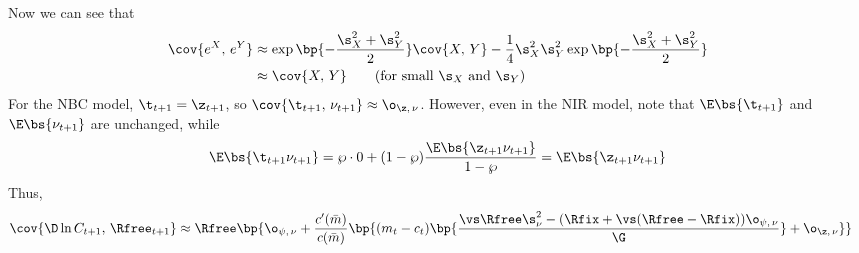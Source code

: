 Now we can see that
\begin{align*}
    \cov{e^X,\,e^Y} &\approx \exp\bp{-\frac{\s_X^2 + \s_Y^2}{2}}\cov{X,\,Y} - \frac{1}{4}{\s_X^2\s_Y^2}\exp\bp{-\frac{\s_X^2 + \s_Y^2}{2}}\\
    &\approx \cov{X,\,Y} \tag{for small $\s_X$ and $\s_Y$}
\end{align*}
For the NBC model, $\t_{t+1} = \z_{t+1}$, so $\cov{\t_{t+1},\,\nu_{t+1}} \approx \o_{\z,\,\nu}$. However, even in the NIR model, note that $\E\bs{\t_{t+1}}$ and $\E\bs{\nu_{t+1}}$ are unchanged, while
\[
\E\bs{\t_{t+1}\nu_{t+1}} = \wp\cdot 0 + (1-\wp)\frac{\E\bs{\z_{t+1}\nu_{t+1}}}{1-\wp} = \E\bs{\z_{t+1}\nu_{t+1}}
\]
Thus,
\begin{align*}
    \cov{\D\ln C_{t+1},\,\Rfree_{t+1}} &\approx \Rfree\bp{\o_{\psi,\,\nu} + \frac{c'(\bar{m})}{c(\bar{m})}\bp{(m_t - c_t)\bp{\frac{\vs\Rfree\s_{\nu}^2 - (\Rfix + \vs(\Rfree - \Rfix))\o_{\psi,\,\nu}}{\G}} + \o_{\z,\,\nu}}}
\end{align*}